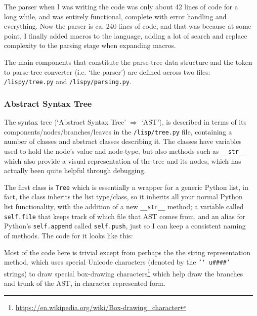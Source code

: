 \documentclass{article}
\newcommand{\code}[1]{\texttt{#1}}
\begin{document}
    The parser when I was writing the code was only about 42 lines of code
    for a long while, and was entirely functional, complete with error handling
    and everything. Now the parser is ca. 240 lines of code, and that was
    because at some point, I finally added macros to the language, adding a lot
    of search and replace complexity to the parsing stage when expanding macros.

    The main components that constitute the parse-tree data structure and
    the token to parse-tree converter (i.e. `the parser') are defined across two
    files: \code{/lispy/tree.py} and \code{/lispy/parsing.py}.

    \clearpage

    \subsubsection{Abstract Syntax Tree}
      The syntax tree (`Abstract Syntax Tree' $\Rightarrow$ `AST'), is described
      in terms of its components/nodes/branches/leaves in the \code{/lisp/tree.py}
      file, containing a number of classes and abstract classes describing it.
      The classes have variables used to hold the node's value and node-type,
      but also methods such as \code{\_\_str\_\_} which also provide a visual
      representation of the tree and its nodes, which has actually been quite
      helpful through debugging.

      The first class is \code{Tree} which is essentially a wrapper for a generic
      Python list, in fact, the class inherits the list type/class, so it inherits
      all your normal Python list functionality, with the addition of a new
      \code{\_\_str\_\_} method; a variable called \code{self.file} that keeps
      track of which file that AST comes from, and an alias for Python's
      \code{self.append} called \code{self.push}, just so I can keep a consistent
      naming of methods. The code for it looks like this:

      \graph{ast_Tree}{Defined at the top of \code{/lispy/tree.py}}

      Most of the code here is trivial except from perhaps the the string
      representation method, which uses special Unicode characters (denoted by
      the \code{'\char`\\u\#\#\#\#'} strings) to draw special box-drawing
      characters\footnote{\url{https://en.wikipedia.org/wiki/Box-drawing_character}}
      which help draw the branches and trunk of the AST, in character
      represented form.
\end{document}
